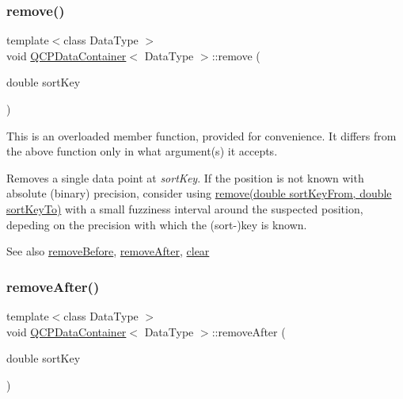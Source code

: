\subsubsection{\texorpdfstring{remove()}{remove()}\hspace{0.1cm}{\footnotesize\ttfamily [2/2]}}
{\footnotesize\ttfamily template$<$class Data\+Type $>$ \\
void \hyperlink{classQCPDataContainer}{Q\+C\+P\+Data\+Container}$<$ Data\+Type $>$\+::remove (\begin{DoxyParamCaption}\item[{double}]{sort\+Key }\end{DoxyParamCaption})}

This is an overloaded member function, provided for convenience. It differs from the above function only in what argument(s) it accepts.

Removes a single data point at {\itshape sort\+Key}. If the position is not known with absolute (binary) precision, consider using \hyperlink{classQCPDataContainer_ae5f569a120648b167efa78835f12fd38}{remove(double sort\+Key\+From, double sort\+Key\+To)} with a small fuzziness interval around the suspected position, depeding on the precision with which the (sort-\/)key is known.

\begin{DoxySeeAlso}{See also}
\hyperlink{classQCPDataContainer_aa7f74cbce304b0369e1626c3798e1eda}{remove\+Before}, \hyperlink{classQCPDataContainer_abbe5d87ffc10b5aeffa5bb42cf03aa3c}{remove\+After}, \hyperlink{classQCPDataContainer_a7e2b29736c6fd761649bda1a54ba967f}{clear} 
\end{DoxySeeAlso}
\mbox{\label{classQCPDataContainer_abbe5d87ffc10b5aeffa5bb42cf03aa3c}} 
\subsubsection{\texorpdfstring{remove\+After()}{removeAfter()}}
{\footnotesize\ttfamily template$<$class Data\+Type $>$ \\
void \hyperlink{classQCPDataContainer}{Q\+C\+P\+Data\+Container}$<$ Data\+Type $>$\+::remove\+After (\begin{DoxyParamCaption}\item[{double}]{sort\+Key }\end{DoxyParamCaption})}


